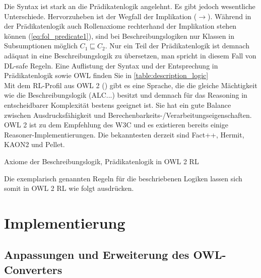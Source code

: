 \documentclass[runningheads,a4paper]{llncs}
\begin{document}
Die Syntax ist stark an die Prädikatenlogik angelehnt. 
Es gibt jedoch wesentliche Unterschiede. 
Hervorzuheben ist der Wegfall der Implikation (\(\to\)). 
Während in der Prädikatenlogik auch Rollenaxiome rechterhand der Implikation stehen können (\eqref{eq:fol_predicate1}), sind bei Beschreibungslogiken nur Klassen in Subsumptionen möglich \(C_1 \sqsubseteq C_2\).
Nur ein Teil der Prädikatenlogik ist demnach adäquat in eine Beschreibungslogik zu übersetzen, man spricht in diesem Fall von DL-safe Regeln. 
Eine Auflistung der Syntax und der Entsprechung in Prädikatenlogik sowie OWL finden Sie in \ref{table:description_logic}
\\
Mit dem RL-Profil aus OWL 2 (\cite{owl2rl}) gibt es eine Sprache, die die gleiche Mächtigkeit wie die Beschreibungslogik (ALC...) besitzt und demnach für das Reasoning in entscheidbarer Komplexität bestens geeignet ist.
Sie hat ein gute Balance zwischen Ausdrucksfähigkeit und Berechenbarkeits-/Verarbeitungseigenschaften.
OWL 2 ist zu dem Empfehlung des W3C und es existieren bereits einige Reasoner-Implementierungen. 
Die bekanntesten derzeit sind Fact++, Hermit, KAON2 und Pellet.


Axiome der Beschreibungslogik, Prädikatenlogik in OWL 2 RL

Die exemplarisch genannten Regeln für die beschriebenen Logiken lassen sich somit in OWL 2 RL wie folgt ausdrücken.









\section{Implementierung}

\subsection{Anpassungen und Erweiterung des OWL-Converters}
\end{document}
